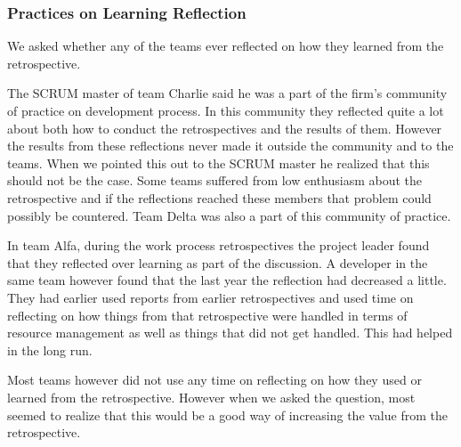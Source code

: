 \subsubsection{Practices on Learning Reflection}
\label{question-15}
We asked whether any of the teams ever reflected on how they learned from the retrospective.

The SCRUM master of team Charlie said he was a part of the firm's community of practice on development process. In this community they reflected quite a lot about both how to conduct the retrospectives and the results of them. However the results from these reflections never made it outside the community and to the teams. When we pointed this out to the SCRUM master he realized that this should not be the case. Some teams suffered from low enthusiasm about the retrospective and if the reflections reached these members that problem could possibly be countered. Team Delta was also a part of this community of practice.

In team Alfa, during the work process retrospectives the project leader found that they reflected over learning as part of the discussion. A developer in the same team however found that the last year the reflection had decreased a little. They had earlier used reports from earlier retrospectives and used time on reflecting on how things from that retrospective were handled in terms of resource management as well as things that did not get handled. This had helped in the long run. 

Most teams however did not use any time on reflecting on how they used or learned from the retrospective. However when we asked the question, most seemed to realize that this would be a good way of increasing the value from the retrospective. 

\begin{table}[!h]
	\begin{center}
	\caption{Learning Reflection}
	\label{table:learning-reflection}
	\end{center}
\end{table}

